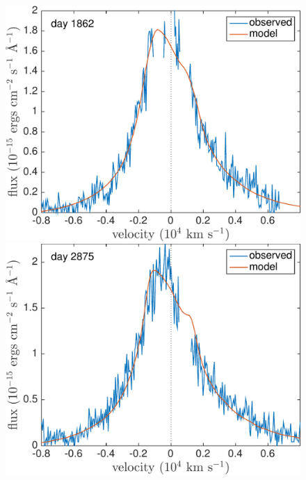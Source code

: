 \begin{figure}
\centering
\includegraphics[trim =0 0 0 0,clip=true,scale=0.4]{chapters/chapter5/images/smooth/best_fit/d1862Ha.pdf}
\hspace{2mm}
\includegraphics[trim =25 0 0 0,clip=true,scale=0.4]{chapters/chapter5/images/smooth/best_fit/d2875Ha.pdf}


\end{figure}
